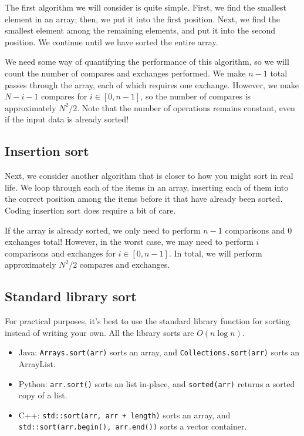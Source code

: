 \documentclass{article}
\begin{document}
The first algorithm we will consider is quite simple. First, we find the smallest element in an array; then, we put it into the first position. Next, we find the smallest element among the remaining elements, and put it into the second position. We continue until we have sorted the entire array.

We need some way of quantifying the performance of this algorithm, so we will count the number of compares and exchanges performed. We make $n-1$ total passes through the array, each of which requires one exchange. However, we make $N-i-1$ compares for $i \in [0, n-1]$, so the number of compares is approximately $N^2/2$. Note that the number of operations remains constant, even if the input data is already sorted!


\subsection{Insertion sort}

Next, we consider another algorithm that is closer to how you might sort in real life. We loop through each of the items in an array, inserting each of them into the correct position among the items before it that have already been sorted. Coding insertion sort does require a bit of care.

If the array is already sorted, we only need to perform $n-1$ comparisons and $0$ exchanges total! However, in the worst case, we may need to perform $i$ comparisons and exchanges for $i \in [0, n-1]$. In total, we will perform approximately $N^2/2$ compares and exchanges.


\subsection{Standard library sort}

For practical purposes, it's best to use the standard library function for sorting instead of writing your own.  All the library sorts are $O(n \log n)$.

\begin{itemize}
    \item Java: \texttt{Arrays.sort(arr)} sorts an array, and \texttt{Collections.sort(arr)} sorts an ArrayList.
    \item Python: \texttt{arr.sort()} sorts an list in-place, and \texttt{sorted(arr)} returns a sorted copy of a list.
    \item C++: \texttt{std::sort(arr, arr + length)} sorts an array, and \texttt{std::sort(arr.begin(), arr.end())} sorts a vector container.
\end{itemize}
\end{document}
